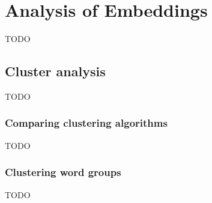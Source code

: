\chapter{Analysis of Embeddings}
TODO

\section{Cluster analysis}
TODO

\subsection{Comparing clustering algorithms}
TODO

\subsection{Clustering word groups}
TODO